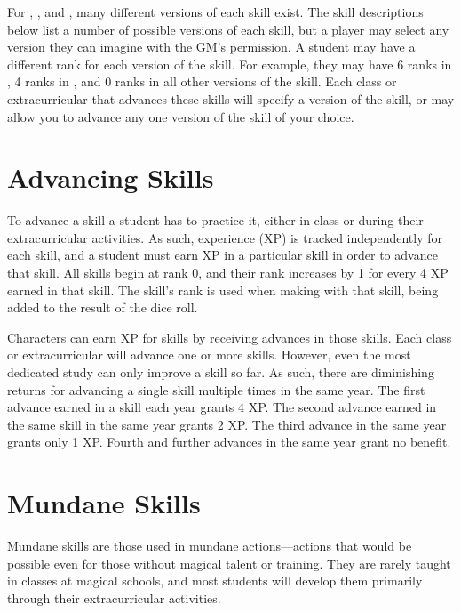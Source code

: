 For , , and , many different versions of each skill exist.
The skill descriptions below list a number of possible versions of each skill, but a player may select any version they can imagine with the GM's permission.
A student may have a different rank for each version of the skill.
For example, they may have 6 ranks in , 4 ranks in , and 0 ranks in all other versions of the skill.
Each class or extracurricular that advances these skills will specify a version of the skill, or may allow you to advance any one version of the skill of your choice.

\section{Advancing Skills}

To advance a skill a student has to practice it, either in class or during their extracurricular activities.
As such, experience (XP) is tracked independently for each skill, and a student must earn XP in a particular skill in order to advance that skill.
All skills begin at rank 0, and their rank increases by 1 for every 4 XP earned in that skill.
The skill's rank is used when making {\tests} with that skill, being added to the result of the dice roll.

Characters can earn XP for skills by receiving advances in those skills.
Each class or extracurricular will advance one or more skills.
However, even the most dedicated study can only improve a skill so far.
As such, there are diminishing returns for advancing a single skill multiple times in the same year.
The first advance earned in a skill each year grants 4 XP.
The second advance earned in the same skill in the same year grants 2 XP.
The third advance in the same year grants only 1 XP.
Fourth and further advances in the same year grant no benefit.

\section{Mundane Skills}

Mundane skills are those used in mundane actions---actions that would be possible even for those without magical talent or training.
They are rarely taught in classes at magical schools, and most students will develop them primarily through their extracurricular activities.

